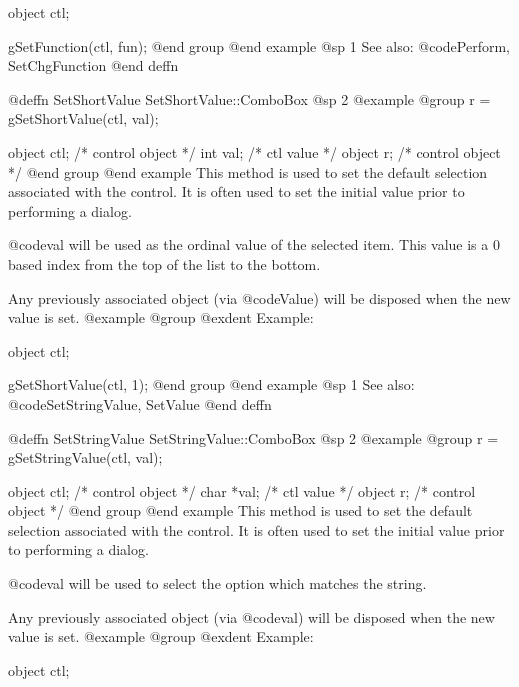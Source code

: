{object  ctl;

gSetFunction(ctl, fun);
@end group
@end example
@sp 1
See also:  @code{Perform, SetChgFunction}
@end deffn






















@deffn {SetShortValue} SetShortValue::ComboBox
@sp 2
@example
@group
r = gSetShortValue(ctl, val);

object  ctl;    /*  control object  */
int     val;    /*  ctl value       */
object  r;      /*  control object  */
@end group
@end example
This method is used to set the default selection associated with the
control.  It is often used to set the initial value prior to performing
a dialog.

@code{val} will be used as the ordinal value of the selected item.  This
value is a 0 based index from the top of the list to the bottom.

Any previously associated object (via @code{Value}) will be disposed
when the new value is set.
@example
@group
@exdent Example:

object  ctl;

gSetShortValue(ctl, 1);
@end group
@end example
@sp 1
See also:  @code{SetStringValue, SetValue}
@end deffn









@deffn {SetStringValue} SetStringValue::ComboBox
@sp 2
@example
@group
r = gSetStringValue(ctl, val);

object  ctl;    /*  control object  */
char    *val;   /*  ctl value       */
object  r;      /*  control object  */
@end group
@end example
This method is used to set the default selection associated with the
control.  It is often used to set the initial value prior to performing
a dialog.  

@code{val} will be used to select the option which matches the string.

Any previously associated object (via @code{val}) will be disposed when
the new value is set.  
@example
@group
@exdent Example:

object  ctl;

}
